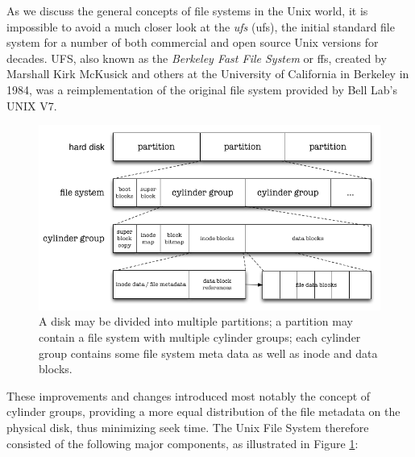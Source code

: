 As we discuss the general concepts of file systems in
the Unix world, it is impossible to avoid a much
closer look at the {\em \acrlong{ufs}} (\gls{ufs}),
the initial standard file system for a
number of both commercial and open source Unix
versions for decades.  UFS, also known as the {\em
Berkeley Fast File System} or \gls{ffs}, created by
Marshall Kirk
McKusick\cite{filesystems:ffs} and others at the University of
California in Berkeley in 1984, was a reimplementation
of the original file system provided by Bell
Lab's UNIX V7.

\begin{figure}[t]
	\centering
	\includegraphics[width=.85\textwidth]{04/pics/ufs-details}
		\caption[UFS Details]{A disk may be divided into multiple
			partitions; a partition may contain a file system
			with multiple cylinder groups; each cylinder group
			contains some file system meta data as well as
			inode and data blocks.
			\label{fig:file-systems:ufs-details}}
\end{figure}

These improvements and changes introduced most notably
the concept of cylinder groups, providing a more equal
distribution of the file metadata on the physical
disk, thus minimizing seek time.  The Unix File System
therefore consisted of the following major components,
as illustrated in Figure
\ref{fig:file-systems:ufs-details}:

